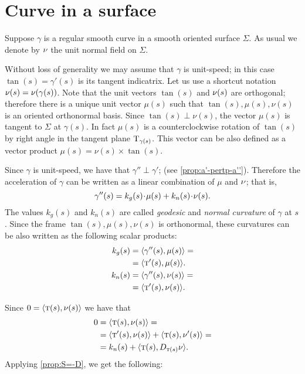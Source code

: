 

\section{Curve in a surface}

Suppose $\gamma$ is a regular smooth curve in a smooth oriented surface $\Sigma$.
As usual we denote by $\nu$ the unit normal field on $\Sigma$.

Without loss of generality we may assume that $\gamma$ is unit-speed;
in this case $\tan(s)=\gamma'(s)$ is its tangent indicatrix.
Let us use a shortcut notation $\nu(s)=\nu(\gamma(s))$.
Note that the unit vectors $\tan(s)$ and $\nu(s)$ are orthogonal;
therefore there is a unique unit vector $\mu(s)$ such that 
$\tan(s),\mu(s),\nu(s)$ is an oriented orthonormal basis.
Since $\tan(s)\perp\nu(s)$, the vector $\mu(s)$ is tangent to $\Sigma$ at $\gamma(s)$.
In fact $\mu(s)$ is a counterclockwise rotation of $\tan(s)$ by right angle in the tangent plane $\mathrm{T}_{\gamma(s)}$.
This vector can be also defined as a vector product $\mu(s)=\nu(s)\times \tan(s)$. %

Since $\gamma$ is unit-speed, we have that $\gamma''\perp \gamma'$; (see \ref{prop:a'-pertp-a''}).
Therefore the acceleration of $\gamma$ can be written as a linear combination of $\mu$ and $\nu$;
that is,
\[\gamma''(s)=k_g(s)\cdot \mu(s)+k_n(s)\cdot\Norm(s).\]
The values $k_g(s)$ and $k_n(s)$ are called \emph{geodesic} and \emph{normal curvature} of $\gamma$ at $s$.
Since the frame $\tan(s),\mu(s),\nu(s)$ is orthonormal, these curvatures can be also written as the following scalar products:
\begin{align*}
k_g(s)&=\langle \gamma''(s),\mu(s)\rangle
=
\\
&=\langle \textsc{t}'(s),\mu(s)\rangle.
\\
k_n(s)&=\langle \gamma''(s),\nu(s)\rangle=
\\
&=\langle \textsc{t}'(s),\nu(s)\rangle.
\end{align*}

Since $0=\langle \textsc{t}(s),\nu(s)\rangle$ we have 
that 
\begin{align*}
0&=\langle \textsc{t}(s),\nu(s)\rangle=
\\
&=\langle \textsc{t}'(s),\nu(s)\rangle+\langle \textsc{t}(s),\nu'(s)\rangle=
\\
&=k_n(s)+\langle \textsc{t}(s),D_{\textsc{t}(s)}\nu\rangle.
\end{align*}
Applying \ref{prop:S=-D},  we get the following:

